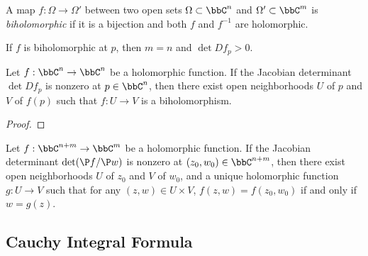 
    \begin{definition}\label{def:biholomorphic_map}
        A map \(f: \Omega \to \Omega'\) between two open sets \(\Omega \subset \bbC^n\) and \(\Omega' \subset \bbC^m\) is \emph{biholomorphic} if it is a bijection and both \(f\) and \(f^{-1}\) are holomorphic.
    \end{definition}

    If \(f\) is biholomorphic at \(p\), then \(m = n\) and \(\det Df_p > 0\).

    \begin{theorem}\label{thm:holomorphic_inverse_function_theorem}
        Let \(f: \bbC^n \to \bbC^n\) be a holomorphic function. 
        If the Jacobian determinant \(\det Df_p\) is nonzero at \(p \in \bbC^n\), then there exist open neighborhoods \(U\) of \(p\) and \(V\) of \(f(p)\) such that \(f: U \to V\) is a biholomorphism.
    \end{theorem}
    \begin{proof}
    \end{proof}

    \begin{theorem}\label{thm:holomorphic_implicit_function_theorem}
        Let \(f: \bbC^{n+m} \to \bbC^m\) be a holomorphic function. If the Jacobian determinant \(\det(\P f/\P w)\) is nonzero at \((z_0, w_0) \in \bbC^{n+m}\), then there exist open neighborhoods \(U\) of \(z_0\) and \(V\) of \(w_0\), and a unique holomorphic function \(g: U \to V\) such that for any \((z, w) \in U \times V\), \(f(z, w) = f(z_0, w_0)\) if and only if \(w = g(z)\).
    \end{theorem}

\subsection{Cauchy Integral Formula}

